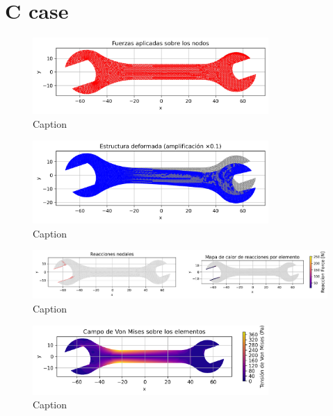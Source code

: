 \section{C case}

\begin{figure}[H]
  \centering
  \includegraphics[width=0.8\textwidth]{GRAFICOS/Case c_fuerzas.png}
  \caption{Caption}
  \label{fig:strain}
\end{figure}

\begin{figure}[H]
  \centering
  \includegraphics[width=0.8\textwidth]{GRAFICOS/Case c_deformada.png}
  \caption{Caption}
  \label{fig:stress}
\end{figure}

\begin{figure}[H]
  \centering
  \includegraphics[width=1\textwidth]{GRAFICOS/Case c_deformada_reacciones.png}
  \caption{Caption}
  \label{fig:principal}
\end{figure}

\begin{figure}[H]
  \centering
  \includegraphics[width=0.8\textwidth]{GRAFICOS/Case c_von_mises.png}
  \caption{Caption}
  \label{fig:principal}
\end{figure}

